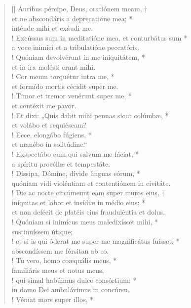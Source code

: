 \begin{verse}[\versewidth]
Auribus pércipe, Deus, oratiónem meam, †\\
et ne abscondáris a deprecatióne mea; *\\
inténde mihi et exáudi me.\\!
\vin Excússus sum in meditatióne mea, et conturbátus sum *\\
\vin a voce inimíci et a tribulatióne peccatóris.\\!
Quóniam devolvérunt in me iniquitátem, *\\
et in ira molésti erant mihi.\\!
\vin Cor meum torquétur intra me, *\\
\vin et formído mortis cécidit super me.\\!
Timor et tremor venérunt super me, *\\
et contéxit me pavor.\\!
\vin Et dixi: „Quis dabit mihi pennas sicut colúmbæ, *\\
\vin et volábo et requiéscam?\\!
Ecce, elongábo fúgiens, *\\
et manébo in solitúdine.“\\!
\vin Exspectábo eum qui salvum me fáciat, *\\
\vin a spíritu procéllæ et tempestáte.\\!
Díssipa, Dómine, dívide linguas eórum, *\\
quóniam vidi violéntiam et contentiónem in civitáte.\\!
\vin Die ac nocte circúmeunt eam super muros eius, †\\
\vin iníquitas et labor et insídiæ in médio eius; *\\
\vin et non defécit de platéis eius frauduléntia et dolus.\\!
Quóniam si inimícus meus maledixísset mihi, *\\
sustinuíssem útique;\\!
\vin et si is qui óderat me super me magnificátus fuísset, *\\
\vin abscondíssem me fórsitan ab eo.\\!
Tu vero, homo coæquális meus, *\\
familiáris meus et notus meus,\\!
\vin qui simul habúimus dulce consórtium: *\\
\vin in domo Dei ambulávimus in concúrsu.\\!
Véniat mors super illos, *\\

\end{verse}
